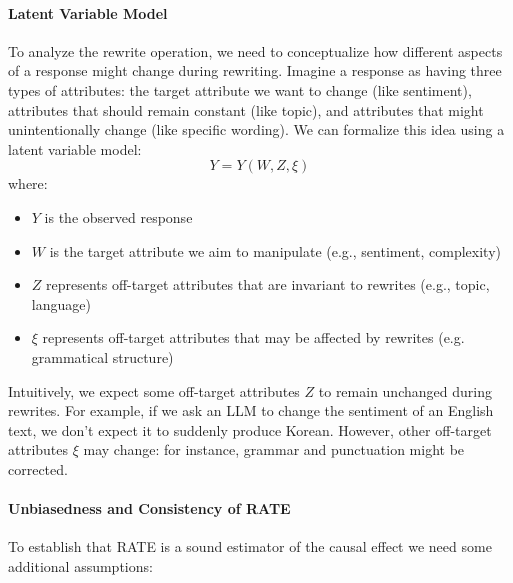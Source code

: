 \documentclass{article}
\theoremstyle{definition}
\begin{document}
\paragraph{Latent Variable Model}
To analyze the rewrite operation, we need to conceptualize how different aspects of a response might change during rewriting. Imagine a response as having three types of attributes: the target attribute we want to change (like sentiment), attributes that should remain constant (like topic), and attributes that might unintentionally change (like specific wording). We can formalize this idea using a latent variable model:
\[ Y = Y(W, Z, \xi) \]
where:
\begin{itemize}
  \item $Y$ is the observed response
  \item $W$ is the target attribute we aim to manipulate (e.g., sentiment, complexity)
  \item $Z$ represents off-target attributes that are invariant to rewrites (e.g., topic, language)
  \item $\xi$ represents off-target attributes that may be affected by rewrites (e.g. grammatical structure)
\end{itemize}

Intuitively, we expect some off-target attributes $Z$ to remain unchanged during rewrites. For example, if we ask an LLM to change the sentiment of an English text, we don't expect it to suddenly produce Korean. However, other off-target attributes $\xi$ may change: for instance, grammar and punctuation might be corrected.

\paragraph{Unbiasedness and Consistency of RATE}
To establish that RATE is a sound estimator of the causal effect we need some additional assumptions:
\end{document}
